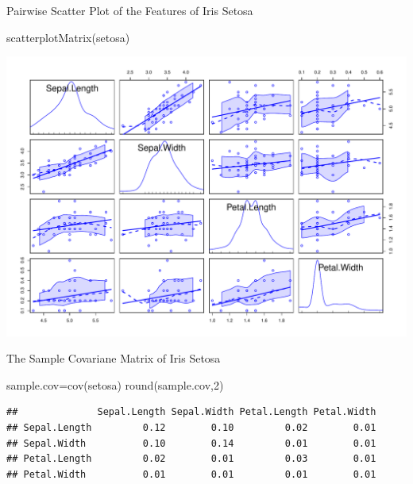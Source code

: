 \documentclass[
  ignorenonframetext,
]{beamer}
\newenvironment{Shaded}{\begin{snugshade}}{\end{snugshade}}
\newcommand{\DecValTok}[1]{\textcolor[rgb]{0.00,0.00,0.81}{#1}}
\newcommand{\FunctionTok}[1]{\textcolor[rgb]{0.00,0.00,0.00}{#1}}
\newcommand{\NormalTok}[1]{#1}
\newcommand{\OtherTok}[1]{\textcolor[rgb]{0.56,0.35,0.01}{#1}}
\begin{document}
\begin{frame}[fragile]{Pairwise Scatter Plot of the Features of Iris
Setosa}
\protect\hypertarget{pairwise-scatter-plot-of-the-features-of-iris-setosa}{}
\begin{Shaded}
\begin{Highlighting}[]
\FunctionTok{scatterplotMatrix}\NormalTok{(setosa)}
\end{Highlighting}
\end{Shaded}

\includegraphics[width=0.75\linewidth]{Lecture03_RandomV_files/figure-beamer/unnamed-chunk-3-1}
\end{frame}

\begin{frame}[fragile]{The Sample Covariane Matrix of Iris Setosa}
\protect\hypertarget{the-sample-covariane-matrix-of-iris-setosa}{}
\begin{Shaded}
\begin{Highlighting}[]
\NormalTok{sample.cov}\OtherTok{=}\FunctionTok{cov}\NormalTok{(setosa)}
\FunctionTok{round}\NormalTok{(sample.cov,}\DecValTok{2}\NormalTok{)}
\end{Highlighting}
\end{Shaded}

\begin{verbatim}
##              Sepal.Length Sepal.Width Petal.Length Petal.Width
## Sepal.Length         0.12        0.10         0.02        0.01
## Sepal.Width          0.10        0.14         0.01        0.01
## Petal.Length         0.02        0.01         0.03        0.01
## Petal.Width          0.01        0.01         0.01        0.01
\end{verbatim}
\end{frame}
\end{document}

